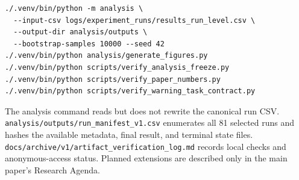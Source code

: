 \documentclass{article}
\begin{document}
{\small
\begin{verbatim}
./.venv/bin/python -m analysis \
  --input-csv logs/experiment_runs/results_run_level.csv \
  --output-dir analysis/outputs \
  --bootstrap-samples 10000 --seed 42
./.venv/bin/python analysis/generate_figures.py
./.venv/bin/python scripts/verify_analysis_freeze.py
./.venv/bin/python scripts/verify_paper_numbers.py
./.venv/bin/python scripts/verify_warning_task_contract.py
\end{verbatim}
}

The analysis command reads but does not rewrite the canonical run CSV. \texttt{analysis/outputs/run\_manifest\_v1.csv} enumerates all 81 selected runs and hashes the available metadata, final result, and terminal state files. \texttt{docs/archive/v1/artifact\_verification\_log.md} records local checks and anonymous-access status. Planned extensions are described only in the main paper's Research Agenda.
\end{document}
